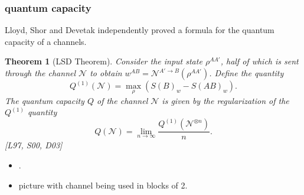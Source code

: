 \documentclass[12pt]{beamer}
\newcommand{\mcal}{\mathcal}
\newcommand{\be}{\begin{equation}}
\newcommand{\ee}{\end{equation}}
\theoremstyle{plain}
\newtheorem{Th}{Theorem}[section]
\theoremstyle{definition}
\begin{document}
\begin{frame}
	\frametitle{quantum capacity}
    Lloyd, Shor and Devetak independently proved a formula for the quantum capacity
    of a channels.
    
    \begin{Th}[LSD Theorem]
    
    Consider the input state $\rho^{AA'}$, half of which is sent
    through the channel $\mcal{N}$ to obtain $w^{AB} = \mcal{N}^{A'\to B}(\rho^{AA'})$.
    Define the quantity 
    \be
        Q^{(1)}(\mcal{N}) = \max_\rho  (S(B)_w - S(AB)_w).
    \ee
    The quantum capacity $Q$ of the channel $\mcal{N}$ is given by the regularization 
    of the $Q^{(1)}$ quantity
    \be
        Q(\mcal{N}) = \lim_{n\to \infty} \frac{Q^{(1)}(\mcal{N}^{\otimes n} )}{n}.
    \ee 
    [L97, S00, D03]
    \end{Th}
    
	\begin{itemize}
		\item .
		\item picture with channel being used in blocks of 2.
	\end{itemize}
\end{frame}






\end{document}
